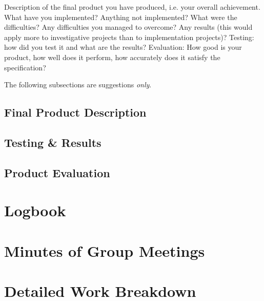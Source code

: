 \documentclass[a4paper,11pt]{article}
\begin{document}
Description of the final product you have produced, i.e. your overall achievement.
What have you implemented? Anything not implemented? What were the difficulties?
Any difficulties you managed to overcome? Any results (this would apply more to
investigative projects than to implementation projects)? Testing: how did you test
it and what are the results? Evaluation: How good is your product, how well does
it perform, how accurately does it satisfy the specification? 

The following subsections are suggestions \emph{only}.

\subsection{Final Product Description}

\subsection{Testing \& Results}

\subsection{Product Evaluation
}

\clearpage
\appendix

\section{Logbook}

\clearpage
\section{Minutes of Group Meetings}

\clearpage
\section{Detailed Work Breakdown}
\end{document}

